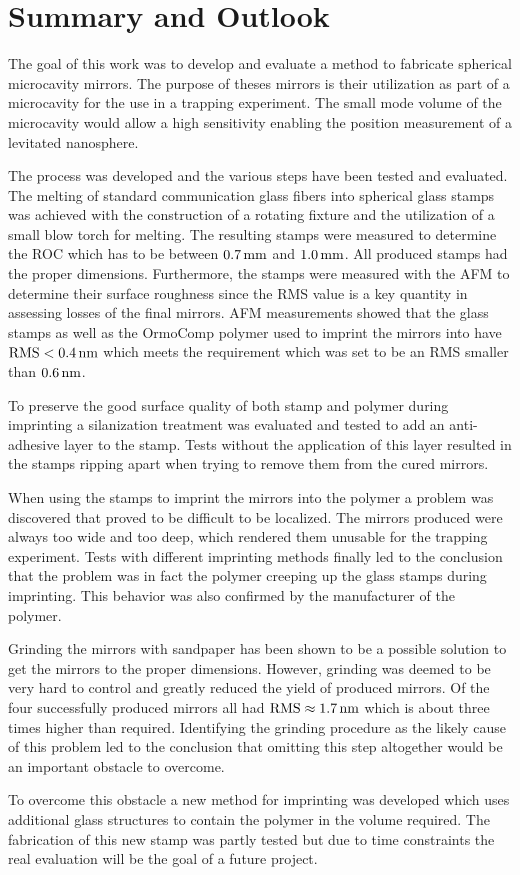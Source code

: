 \chapter{Summary and Outlook}
The goal of this work was to develop and evaluate a method to fabricate spherical microcavity mirrors. The purpose of theses mirrors is their utilization as part of a microcavity for the use in a trapping experiment. The small mode volume of the microcavity would allow a high sensitivity enabling the position measurement of a levitated nanosphere.

The process was developed and the various steps have been tested and evaluated. The melting of standard communication glass fibers into spherical glass stamps was achieved with the construction of a rotating fixture and the utilization of a small blow torch for melting. The resulting stamps were measured to determine the ROC which has to be between $0.7\mm$ and $1.0\mm$. All produced stamps had the proper dimensions. Furthermore, the stamps were measured with the AFM to determine their surface roughness since the RMS value is a key quantity in assessing losses of the final mirrors. AFM measurements showed that the glass stamps as well as the OrmoComp polymer used to imprint the mirrors into have $\si{RMS}<0.4\nm$ which meets the requirement which was set to be an RMS smaller than $0.6\nm$.

To preserve the good surface quality of both stamp and polymer during imprinting a silanization treatment was evaluated and tested to add an anti-adhesive layer to the stamp. Tests without the application of this layer resulted in the stamps ripping apart when trying to remove them from the cured mirrors.

When using the stamps to imprint the mirrors into the polymer a problem was discovered that proved to be difficult to be localized. The mirrors produced were always too wide and too deep, which rendered them unusable for the trapping experiment. Tests with different imprinting methods finally led to the conclusion that the problem was in fact the polymer creeping up the glass stamps during imprinting. This behavior was also confirmed by the manufacturer of the polymer. 

Grinding the mirrors with sandpaper has been shown to be a possible solution to get the mirrors to the proper dimensions. However, grinding was deemed to be very hard to control and greatly reduced the yield of produced mirrors. Of the four successfully produced mirrors all had $\si{RMS}\approx 1.7\nm$ which is about three times higher than required. Identifying the grinding procedure as the likely cause of this problem led to the conclusion that omitting this step altogether would be an important obstacle to overcome.

To overcome this obstacle a new method for imprinting was developed which uses additional glass structures to contain the polymer in the volume required. The fabrication of this new stamp was partly tested but due to time constraints the real evaluation will be the goal of a future project.